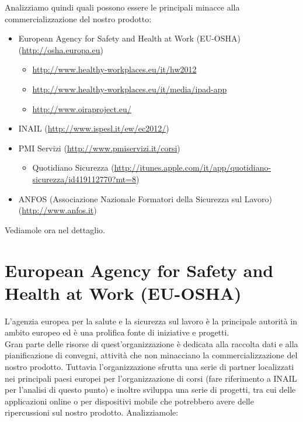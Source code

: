 Analizziamo quindi quali possono essere le principali minacce alla commercializzazione del nostro prodotto:


\begin{itemize}
	\item European Agency for Safety and Health at Work (EU-OSHA) (\url{http://osha.europa.eu})
		\begin{itemize}
			\item \url{http://www.healthy-workplaces.eu/it/hw2012}
			\item \url{http://www.healthy-workplaces.eu/it/media/ipad-app}
			\item \url{http://www.oiraproject.eu/}
		\end{itemize}
	\item INAIL (\url{http://www.ispesl.it/ew/ec2012/})
	\item PMI Servizi (\url{http://www.pmiservizi.it/corsi})
		\begin{itemize}
			\item Quotidiano Sicurezza (\url{http://itunes.apple.com/it/app/quotidiano-sicurezza/id419112770?mt=8})
		\end{itemize}
	\item ANFOS (Associazione Nazionale Formatori della Sicurezza sul Lavoro) (\url{http://www.anfos.it})
\end{itemize}

Vediamole ora nel dettaglio.

\section*{European Agency for Safety and Health at Work (EU-OSHA)}

L'agenzia europea per la salute e la sicurezza sul lavoro è la principale autorità in ambito europeo ed è una prolifica fonte di iniziative e progetti.\\
Gran parte delle risorse di quest'organizzazione è dedicata alla raccolta dati e alla pianificazione di convegni, attività che non minacciano la commercializzazione del nostro prodotto. Tuttavia l'organizzazione sfrutta una serie di partner localizzati nei principali paesi europei per l'organizzazione di corsi (fare riferimento a INAIL per l'analisi di questo punto) e inoltre sviluppa una serie di progetti, tra cui delle applicazioni online o per dispositivi mobile che potrebbero avere delle ripercussioni sul nostro prodotto. Analizziamole:

